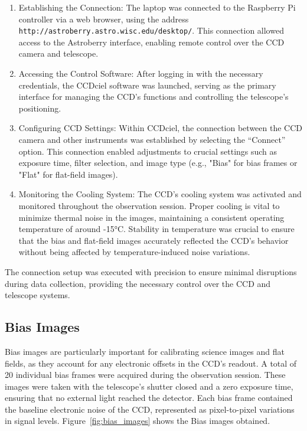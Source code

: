\documentclass[linenumbers,twocolumn]{aastex631}
\begin{document}
\begin{enumerate}
    \item Establishing the Connection: The laptop was connected to the Raspberry Pi controller via a web browser, using the address \texttt{http://astroberry.astro.wisc.edu/desktop/}. This connection allowed access to the Astroberry interface, enabling remote control over the CCD camera and telescope.
    \item Accessing the Control Software: After logging in with the necessary credentials, the CCDciel software was launched, serving as the primary interface for managing the CCD's functions and controlling the telescope's positioning.
    \item Configuring CCD Settings: Within CCDciel, the connection between the CCD camera and other instruments was established by selecting the “Connect” option. This connection enabled adjustments to crucial settings such as exposure time, filter selection, and image type (e.g., "Bias" for bias frames or "Flat" for flat-field images).
    \item Monitoring the Cooling System: The CCD's cooling system was activated and monitored throughout the observation session. Proper cooling is vital to minimize thermal noise in the images, maintaining a consistent operating temperature of around -15°C. Stability in temperature was crucial to ensure that the bias and flat-field images accurately reflected the CCD’s behavior without being affected by temperature-induced noise variations.
\end{enumerate}
The connection setup was executed with precision to ensure minimal disruptions during data collection, providing the necessary control over the CCD and telescope systems.

\subsection{Bias Images}

Bias images are particularly important for calibrating science images and flat fields, as they account for any electronic offsets in the CCD's readout. A total of 20 individual bias frames were acquired during the observation session. These images were taken with the telescope's shutter closed and a zero exposure time, ensuring that no external light reached the detector. Each bias frame contained the baseline electronic noise of the CCD, represented as pixel-to-pixel variations in signal levels.
Figure~\ref{fig:bias_images} shows the Bias images obtained.
\end{document}
